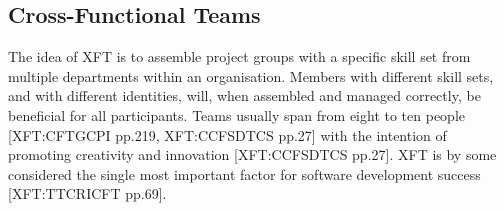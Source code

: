 \documentclass[fina_report_innit.tex]{subfiles}
\begin{document}
\subsection{Cross-Functional Teams}
The idea of XFT is to assemble project groups with a specific skill set from multiple departments within an organisation. Members with different skill sets, and with different identities, will, when assembled and managed correctly, be beneficial for all participants. Teams usually span from eight to ten people [XFT:CFTGCPI pp.219, XFT:CCFSDTCS pp.27] with the intention of promoting creativity and innovation [XFT:CCFSDTCS pp.27]. XFT is by some considered the single most important factor for software development success [XFT:TTCRICFT pp.69].
\end{document}

